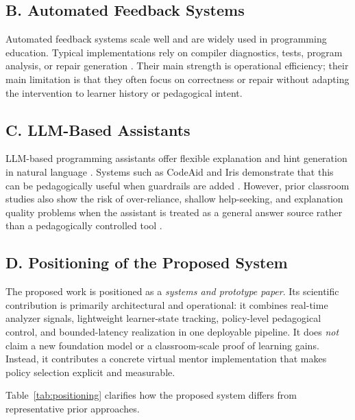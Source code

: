 ﻿\documentclass[conference]{IEEEtran}
\begin{document}
\subsection*{B. Automated Feedback Systems}

Automated feedback systems scale well and are widely used in programming education. Typical implementations rely on compiler diagnostics, tests, program analysis, or repair generation \cite{AutomatedAssessmentToolsForGrading2022,AutomatedGradingandFeedbackToolsforProgrammingEducationSystematicReview,NavigatingAutomatedFeedback}. Their main strength is operational efficiency; their main limitation is that they often focus on correctness or repair without adapting the intervention to learner history or pedagogical intent.

\subsection*{C. LLM-Based Assistants}

LLM-based programming assistants offer flexible explanation and hint generation in natural language \cite{SystematicLiteratureReviewonLLM,pankiewicz2023largelanguagemodelsgpt}. Systems such as CodeAid and Iris demonstrate that this can be pedagogically useful when guardrails are added \cite{CodeAid,IRIS}. However, prior classroom studies also show the risk of over-reliance, shallow help-seeking, and explanation quality problems when the assistant is treated as a general answer source rather than a pedagogically controlled tool \cite{PatternsofLLMPoweredProgrammingAssistant,FeasibilityStudyofAugmentingTeachingAssistantswithAI}.

\subsection*{D. Positioning of the Proposed System}

The proposed work is positioned as a \emph{systems and prototype paper}. Its scientific contribution is primarily architectural and operational: it combines real-time analyzer signals, lightweight learner-state tracking, policy-level pedagogical control, and bounded-latency realization in one deployable pipeline. It does \emph{not} claim a new foundation model or a classroom-scale proof of learning gains. Instead, it contributes a concrete virtual mentor implementation that makes policy selection explicit and measurable.

Table~\ref{tab:positioning} clarifies how the proposed system differs from representative prior approaches.
\end{document}
